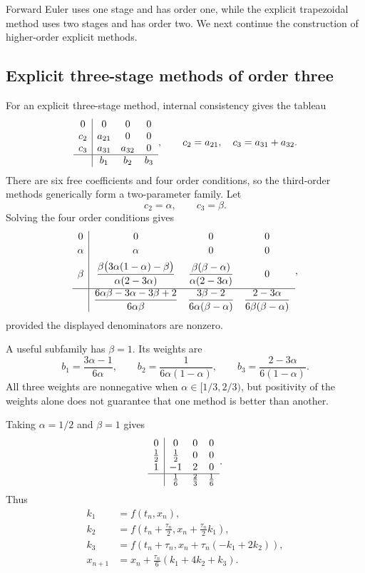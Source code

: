 Forward Euler uses one stage and has order one, while the explicit
trapezoidal method uses two stages and has order two. We next continue
the construction of higher-order explicit methods.

\subsection{Explicit three-stage methods of order three}

For an explicit three-stage method, internal consistency gives the
tableau
\[
  \begin{array}{c|ccc}
    0&0&0&0\\
    c_2&a_{21}&0&0\\
    c_3&a_{31}&a_{32}&0\\ \hline
      &b_1&b_2&b_3
  \end{array},
  \qquad
  c_2=a_{21},
  \quad
  c_3=a_{31}+a_{32}.
\]
There are six free coefficients and four order conditions, so the
third-order methods generically form a two-parameter family. Let
\[
  c_2=\alpha,
  \qquad
  c_3=\beta.
\]
Solving the four order conditions gives
\[
  \begin{array}{c|ccc}
    0&0&0&0\\[2pt]
    \alpha&\alpha&0&0\\[4pt]
    \beta
      &\dfrac{\beta\bigl(3\alpha(1-\alpha)-\beta\bigr)}
              {\alpha(2-3\alpha)}
      &\dfrac{\beta(\beta-\alpha)}{\alpha(2-3\alpha)}
      &0\\[8pt] \hline
      &\dfrac{6\alpha\beta-3\alpha-3\beta+2}{6\alpha\beta}
      &\dfrac{3\beta-2}{6\alpha(\beta-\alpha)}
      &\dfrac{2-3\alpha}{6\beta(\beta-\alpha)}
  \end{array},
\]
provided the displayed denominators are nonzero.

A useful subfamily has \(\beta=1\). Its weights are
\[
  b_1=\frac{3\alpha-1}{6\alpha},
  \qquad
  b_2=\frac{1}{6\alpha(1-\alpha)},
  \qquad
  b_3=\frac{2-3\alpha}{6(1-\alpha)}.
\]
All three weights are nonnegative when
\(\alpha\in[1/3,2/3)\), but positivity of the weights alone does not
guarantee that one method is better than another.

\begin{example}
  Taking \(\alpha=1/2\) and \(\beta=1\) gives
  \[
    \begin{array}{c|ccc}
      0&0&0&0\\
      \tfrac12&\tfrac12&0&0\\
      1&-1&2&0\\ \hline
       &\tfrac16&\tfrac23&\tfrac16
    \end{array}.
  \]
  Thus
  \begin{align*}
    k_1&=f(t_n,x_n),\\
    k_2&=f\left(t_n+\frac{\tau_n}{2},
      x_n+\frac{\tau_n}{2}k_1\right),\\
    k_3&=f\left(t_n+\tau_n,
      x_n+\tau_n(-k_1+2k_2)\right),\\
    x_{n+1}&=x_n+\frac{\tau_n}{6}(k_1+4k_2+k_3).
  \end{align*}
\end{example}

